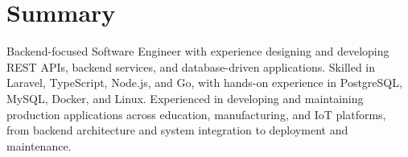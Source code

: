 \section{Summary}
\begin{onecolentry}
	Backend-focused Software Engineer with experience designing and developing REST APIs, backend services, and database-driven applications. Skilled in Laravel, TypeScript, Node.js, and Go, with hands-on experience in PostgreSQL, MySQL, Docker, and Linux. Experienced in developing and maintaining production applications across education, manufacturing, and IoT platforms, from backend architecture and system integration to deployment and maintenance.
\end{onecolentry}
